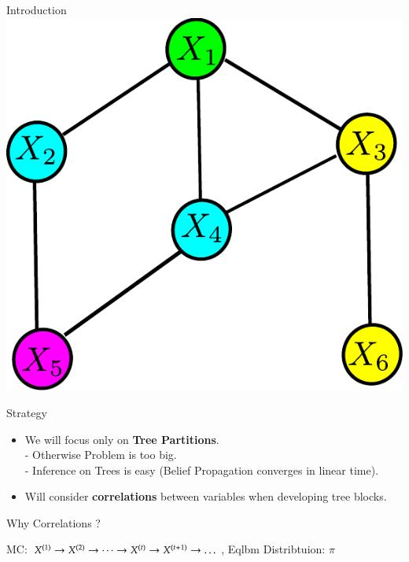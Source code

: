 \documentclass[serif,mathserif,final]{beamer}
\newcommand{\itemlinespace}{0.22in}
\newcommand{\insertlinespace}{\vspace{\itemlinespace}}
\newcommand{\semititle}[1]{\textcolor{red}{\Huge \textbf{#1}}}
\begin{document}
\begin{frame}{}
\begin{columns}[t]
\begin{column}{0.49\linewidth}
\begin{block}{\Huge Introduction}
{          \includegraphics[width=\localimgwidtha]{figs/bg3} 
          \insertlinespace
        }
      \end{block}

      \begin{block}{\Huge Strategy}
        { \huge
        \begin{itemize}
          \item We will focus only on \textbf{Tree Partitions}. \\
            \hspace{0.2in} - Otherwise Problem is too big. \\
            \hspace{0.2in} -  Inference on Trees is easy (Belief Propagation
                              converges in linear time).
          \item Will consider \textbf{correlations} between variables when
                developing tree blocks.
        \end{itemize}
        } 
      \end{block}

      \begin{block}{\Huge Why Correlations ?}
      { \huge
% 
        \insertlinespace
        MC: $X^{(1)} \rightarrow X^{(2)} \rightarrow \dots \rightarrow X^{(t)}
          \rightarrow X^{(t+1)} \rightarrow \dots $, \hspace{0.2in}
        Eqlbm Distribtuion: $\pi$
        \insertlinespace

}
\end{block}
\end{column}
\end{columns}
\end{frame}
\end{document}

